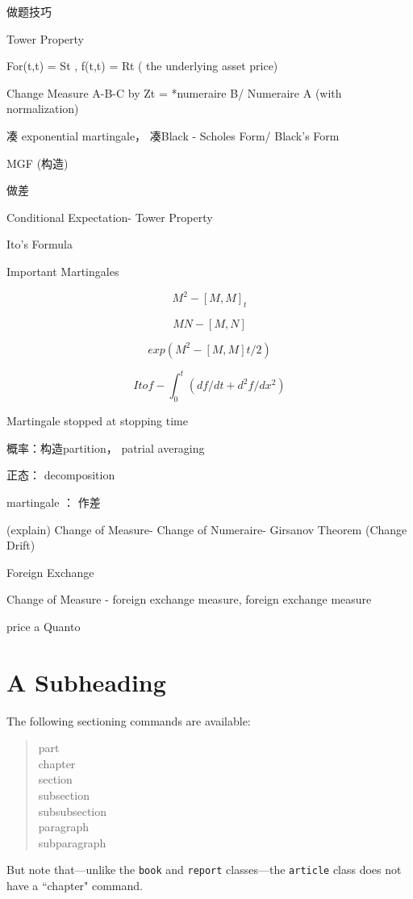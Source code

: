 \documentclass[11pt, openany]{book}              %
\begin{document}
做题技巧

Tower Property

For(t,t) = St , f(t,t) = Rt ( the underlying asset price)

Change Measure A-B-C by Zt = *numeraire B/ Numeraire A (with normalization)

凑 exponential martingale， 凑Black - Scholes Form/ Black’s Form

MGF (构造)

做差

Conditional Expectation- Tower Property

Ito’s Formula

Important Martingales

$$M^2- [M,M]_t$$

$$MN - [M,N]$$

$$exp (M^2 - [M,M]t/2)$$

$$Ito f - \int_0^t ( df/dt +d^2f/dx^2)$$

Martingale stopped at stopping time

概率：构造partition， patrial averaging

正态： decomposition

martingale ： 作差


(explain) Change of Measure- Change of Numeraire- Girsanov Theorem (Change Drift)

Foreign Exchange

Change of Measure - foreign exchange measure, foreign exchange measure

price a Quanto
 
\section{A Subheading}                  %
The following sectioning commands are available:
\begin{quote}                           %
 part \\                                %
 chapter \\                             %
 section \\ 
 subsection \\ 
 subsubsection \\ 
 paragraph \\ 
 subparagraph 
\end{quote}                             %
But note that---unlike the \texttt{book} and \texttt{report} classes---the
\texttt{article} class does not have a ``chapter" command.
 
\end{document}
